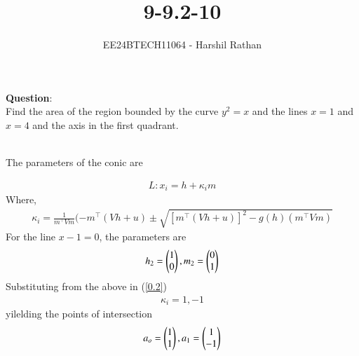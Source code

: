 \documentclass[journal]{IEEEtran}
\begin{document}

\vspace{3cm}

\title{9-9.2-10}
\author{EE24BTECH11064 - Harshil Rathan}
{\let\newpage\relax\maketitle}

\renewcommand{\thefigure}{\theenumi}
\renewcommand{\thetable}{\theenumi}
\setlength{\intextsep}{10pt} %


\renewcommand{\thetable}{\theenumi}
\textbf{Question}:\\
Find the area of the region bounded by the curve $y^2= x$ and the lines $x = 1$ and
$x = 4$ and the axis in the first quadrant.\\
\solution \\
\begin{table}[h!]
    \centering
    
\end{table}
The parameters of the conic are\\
\begin{table}[h!]
    \centering
    
    \label{Table2}
\end{table}
\begin{align}
    L : x_i=h+\kappa_i m 
\end{align}
Where,
\begin{align}
    \kappa_i=\frac{1}{m^\top Vm}(-m^\top(Vh+u) \pm \sqrt{[m^\top(Vh+u)]^2-g(h)(m^\top Vm)}
    \label{0.2}
\end{align}
For the line $x-1=0$, the parameters are\\
\begin{align}    
    h_2=\begin{pmatrix}1\\0\end{pmatrix} , m_2=\begin{pmatrix}0\\1\end{pmatrix}
\end{align}
Substituting from the above in (\ref{0.2})\\
\begin{align}
    \kappa_i= 1,-1
\end{align}
yilelding the points of intersection\\
\begin{align}
  a_o=\begin{pmatrix}1\\1\end{pmatrix},a_1=\begin{pmatrix}1\\-1\end{pmatrix}
\end{align}
\end{document}
